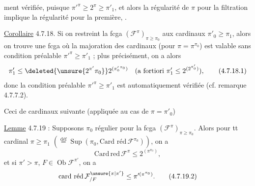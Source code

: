 %
ment vérifiée, puisque $\pi'^\pi\geq2^\pi\geq\pi'_1$, et alors
la  régularité de $\pi$ pour la 
filtration implique la régularité pour la
première, .

\uline{Corollaire} 4.7.18.  Si on restreint la fcga $(\mathcal F^\pi)_{\pi\geq\pi_0}$
aux cardinaux  $\pi'_0\geq\pi_1$,  alors on trouve
une fcga où la majoration des cardinaux
 (pour $\pi=\pi^{\pi_0}$) est valable  sans condition préalable
$\pi'^\pi\geq\pi'_1$ ; plus précisément, on a alors
\[
\pi'_1\leq\deleted{\unsure{2^{\pi'}\pi_0}}2^{(\pi'_0{}^{\pi_0})}
\quad(\text{a fortiori }\pi'_1\leq2^{(2^{\pi'_0})}),
\tag*{(4.7.18.1)}
\]
donc la condition préalable $\pi'^\pi\geq\pi'_1$ est
automatiquement vérifiée 
(cf. remarque 4.7.7.2).

Ceci  
de cardinaux suivante (appliquée au cas de $\pi=\pi'_0$)

\uline{Lemme} 4.7.19 : Supposons $\pi_0$ régulier pour la
fcga $(\mathcal F^\pi)_{\pi\geq\pi_0}$. Alors pour tt cardinal $\pi\geq\pi_1$
$(\overset{\text{déf}}{=}\operatorname{Sup}(\pi_0,\text{Card réd}\,\mathcal F^{\pi_0}))$, on a
\[
\mathrm{Card\,red}\,\mathcal F^\pi\leq2^{(\pi^{\pi_0})},
\tag*{(4.7.19.1)}
\]
et si $\pi'>\pi$,  $F\in\operatorname{Ob}\mathcal F^{\pi'}$, on a
\[
\text{card réd}\,\mathcal F^{\unsure{\pi|\pi'}}_{/F}\leq\pi'^{(\pi^{\pi_0})}.
\tag*{(4.7.19.2)}
\]
